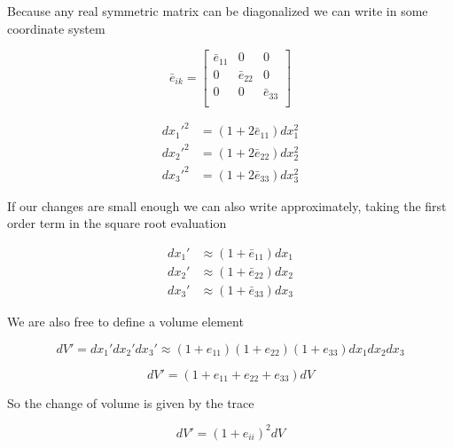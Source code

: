 Because any real symmetric matrix can be diagonalized we can write in some coordinate system

\begin{equation}\label{eqn:continuumL2:n}
\bar{e}_{ik} = 
\begin{bmatrix}
\bar{e}_{11} & 0 & 0 \\
0 & \bar{e}_{22} & 0 \\
0 & 0 & \bar{e}_{33} \\
\end{bmatrix}
\end{equation}

\begin{align}\label{eqn:continuumL2:n}
{dx_1'}^2 &= (1 + 2 \bar{e}_{11}) dx_1^2 \\
{dx_2'}^2 &= (1 + 2 \bar{e}_{22}) dx_2^2 \\
{dx_3'}^2 &= (1 + 2 \bar{e}_{33}) dx_3^2
\end{align}

If our changes are small enough we can also write approximately, taking the first order term in the square root evaluation

\begin{align}\label{eqn:continuumL2:n}
dx_1' &\approx (1 + \bar{e}_{11}) dx_1 \\
dx_2' &\approx (1 + \bar{e}_{22}) dx_2 \\
dx_3' &\approx (1 + \bar{e}_{33}) dx_3
\end{align}

We are also free to define a volume element

\begin{equation}\label{eqn:continuumL2:n}
dV' = 
dx_1'
dx_2'
dx_3'
\approx
(1 + e_{11})
(1 + e_{22})
(1 + e_{33})
dx_1 dx_2 dx_3
\end{equation}

\begin{equation}\label{eqn:continuumL2:n}
dV' = (1 + e_{11} +e_{22} +e_{33} ) dV
\end{equation}

So the change of volume is given by the trace

\begin{equation}\label{eqn:continuumL2:n}
dV' = ( 1 + e_{ii} )^2 dV
\end{equation}

\EndNoBibArticle
